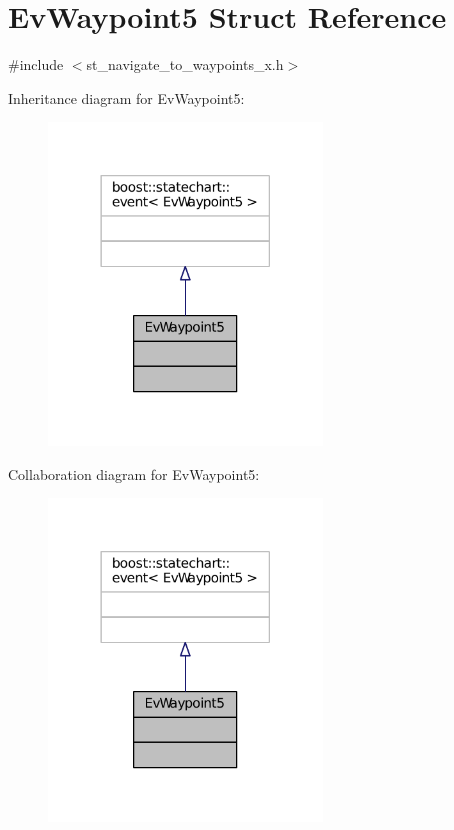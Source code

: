 \hypertarget{structEvWaypoint5}{}\section{Ev\+Waypoint5 Struct Reference}
\label{structEvWaypoint5}


{\ttfamily \#include $<$st\+\_\+navigate\+\_\+to\+\_\+waypoints\+\_\+x.\+h$>$}



Inheritance diagram for Ev\+Waypoint5\+:
\nopagebreak
\begin{figure}[H]
\begin{center}
\leavevmode
\includegraphics[width=206pt]{structEvWaypoint5__inherit__graph}
\end{center}
\end{figure}


Collaboration diagram for Ev\+Waypoint5\+:
\nopagebreak
\begin{figure}[H]
\begin{center}
\leavevmode
\includegraphics[width=206pt]{structEvWaypoint5__coll__graph}
\end{center}
\end{figure}


